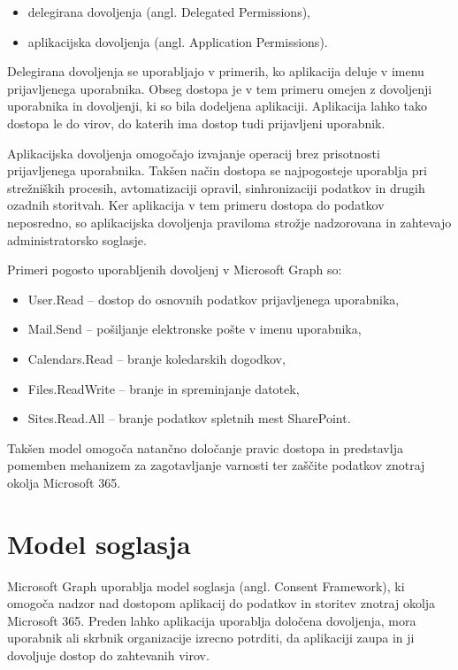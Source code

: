 \documentclass[a4paper, 12pt]{book}
\begin{document}
\begin{itemize}
\item delegirana dovoljenja (angl. Delegated Permissions),
\item aplikacijska dovoljenja (angl. Application Permissions).
\end{itemize}

Delegirana dovoljenja se uporabljajo v primerih, ko aplikacija deluje v imenu prijavljenega uporabnika.
Obseg dostopa je v tem primeru omejen z dovoljenji uporabnika in dovoljenji, ki so bila dodeljena aplikaciji.
Aplikacija lahko tako dostopa le do virov, do katerih ima dostop tudi prijavljeni uporabnik.

Aplikacijska dovoljenja omogočajo izvajanje operacij brez prisotnosti prijavljenega uporabnika. Takšen način dostopa se najpogosteje uporablja pri strežniških procesih, avtomatizaciji opravil, sinhronizaciji podatkov in drugih ozadnih storitvah. Ker aplikacija v tem primeru dostopa do podatkov neposredno, so aplikacijska dovoljenja praviloma strožje nadzorovana in zahtevajo administratorsko soglasje.

Primeri pogosto uporabljenih dovoljenj v Microsoft Graph so:

\begin{itemize}
\item User.Read – dostop do osnovnih podatkov prijavljenega uporabnika,
\item Mail.Send – pošiljanje elektronske pošte v imenu uporabnika,
\item Calendars.Read – branje koledarskih dogodkov,
\item Files.ReadWrite – branje in spreminjanje datotek,
\item Sites.Read.All – branje podatkov spletnih mest SharePoint.
\end{itemize}

Takšen model omogoča natančno določanje pravic dostopa in predstavlja pomemben mehanizem za zagotavljanje varnosti ter zaščite podatkov znotraj okolja Microsoft 365.


\section{Model soglasja}

Microsoft Graph uporablja model soglasja (angl. Consent Framework), ki omogoča nadzor nad dostopom aplikacij do podatkov in storitev znotraj okolja Microsoft 365. Preden lahko aplikacija uporablja določena dovoljenja, mora uporabnik ali skrbnik organizacije izrecno potrditi, da aplikaciji zaupa in ji dovoljuje dostop do zahtevanih virov.
\end{document}
